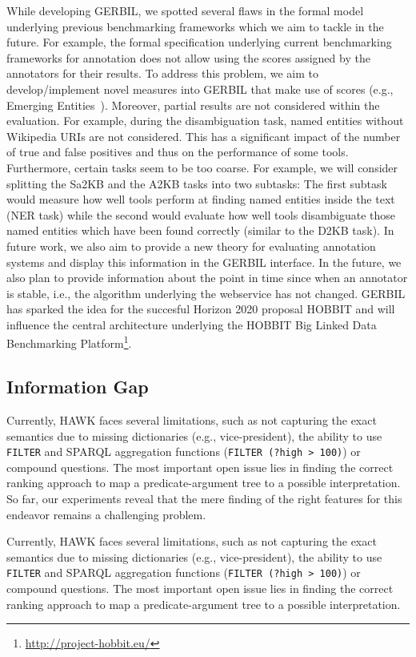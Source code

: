 While developing GERBIL, we spotted several flaws in the formal model underlying previous benchmarking frameworks which we aim to tackle in the future. 
For example, the formal specification underlying current benchmarking frameworks for annotation does not allow using the scores assigned by the annotators for their results. To address this problem, we aim to develop/implement novel measures into GERBIL that make use of scores (e.g., Emerging Entities~\cite{Hoffart:2014:DEE:2566486.2568003}). 
Moreover, partial results are not considered within the evaluation. For example, during the disambiguation task, named entities without Wikipedia URIs are not considered. This has a significant impact of the number of true and false positives and thus on the performance of some tools.
Furthermore, certain tasks seem to be too coarse. For example, we will consider splitting the Sa2KB and the A2KB tasks into two subtasks: The first subtask would measure how well tools perform at finding named entities inside the text (\ac{NER} task) while the second would evaluate how well tools disambiguate those named entities which have been found correctly (similar to the D2KB task).
In future work, we also aim to provide a new theory for evaluating annotation systems and display this information in the GERBIL interface.
In the future, we also plan to provide information about the point in time since when an annotator is stable, i.e., the algorithm underlying the webservice has not changed.
GERBIL has sparked the idea for the succesful Horizon 2020 proposal HOBBIT and will influence the central architecture underlying the HOBBIT Big Linked Data Benchmarking Platform\footnote{\url{http://project-hobbit.eu/}}. 


\subsection*{Information Gap}
Currently, HAWK faces several limitations, such as not capturing the exact semantics due to missing dictionaries (e.g., vice-president), the ability to use \texttt{FILTER} and SPARQL aggregation functions (\texttt{FILTER (?high > 100)}) or compound questions. 
The most important open issue lies in finding the correct ranking approach to map a predicate-argument tree to a possible interpretation. 
So far, our experiments reveal that the mere finding of the right features for this endeavor remains a challenging problem. 

Currently, HAWK faces several limitations, such as not capturing the exact semantics due to missing dictionaries (e.g., vice-president), the ability to use \texttt{FILTER} and SPARQL aggregation functions (\texttt{FILTER (?high > 100)}) or compound questions. 
The most important open issue lies in finding the correct ranking approach to map a predicate-argument tree to a possible interpretation. 

